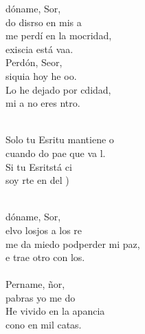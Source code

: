 \begin{cancion}%
	dóname, Sor, \\
	do disrso en mis a \\
	me perdí en la mocridad,\\
	 exiscia está vaa. \\
	Perdón, Seor,\\
	 siquia hoy he oo. \\
	Lo he dejado por cdidad,\\
	 mi a no eres ntro.\\\jump\\
	\begin{chorus}%
	Solo tu Esritu  mantiene o \\
	cuando do pae que va l.\\
	Si tu Esritstá ci\\
	soy rte en del ) \\
	\end{chorus}%
	\jump\\
	dóname, Sor, \\
	elvo losjos a los re \\
	me da miedo podperder mi paz,\\
	e trae otro con los.\\
\jump\\
	Pername, ñor,\\
	 pabras yo me do \\
	He vivido en la apancia\\
	cono en mil catas.\\
\end{cancion}%
